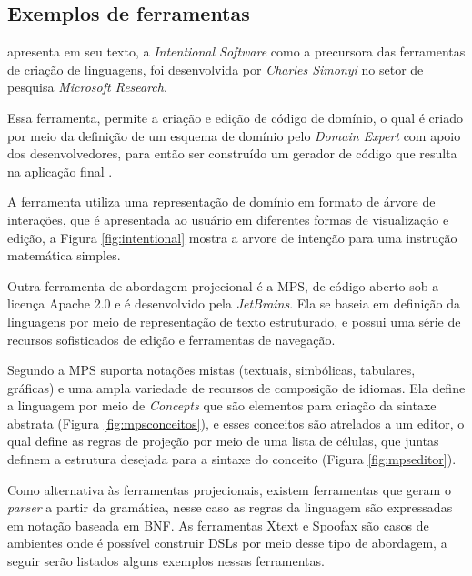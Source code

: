 \newpage
\subsection{Exemplos de ferramentas}
\label{exemplosferramentasdsl}

 apresenta em seu texto, a \textit{Intentional Software} como a precursora das ferramentas de criação de linguagens, foi desenvolvida por \textit{Charles Simonyi} no setor de pesquisa \textit{Microsoft Research}. 

Essa ferramenta, permite a criação e edição de código de domínio, o qual é criado por meio da definição de um esquema de domínio pelo \textit{Domain Expert} com apoio dos desenvolvedores, para então ser construído um gerador de código que resulta na aplicação final \cite{simonyi2006intentional}. 

A ferramenta utiliza uma representação de domínio em formato de árvore de interações, que é apresentada ao usuário em diferentes formas de visualização e edição, a Figura \ref{fig:intentional} mostra a arvore de intenção para uma instrução matemática simples.



Outra ferramenta de abordagem projecional é a \gls{MPS}, de código aberto sob a licença Apache 2.0 e é desenvolvido pela \textit{JetBrains}. Ela se baseia em definição da linguagens por meio de representação de texto estruturado, e possui uma série de recursos sofisticados de edição e ferramentas de navegação. 

Segundo  a \gls{MPS} suporta notações mistas (textuais, simbólicas, tabulares, gráficas) e uma ampla variedade de recursos de composição de idiomas. Ela define a linguagem por meio de \textit{Concepts} que são elementos para criação da sintaxe abstrata (Figura \ref{fig:mpsconceitos}), e esses conceitos são atrelados a um editor, o qual define as regras de projeção por meio de uma lista de células, que juntas definem a estrutura desejada para a sintaxe do conceito (Figura \ref{fig:mpseditor}).





\newpage


Como alternativa às ferramentas projecionais, existem ferramentas que geram o \textit{parser} a partir da gramática, nesse caso as regras da linguagem são expressadas em notação baseada em \gls{BNF}. As ferramentas Xtext e Spoofax são casos de ambientes onde é possível construir \gls{DSL}s por meio desse tipo de abordagem, a seguir serão listados alguns exemplos nessas ferramentas.


